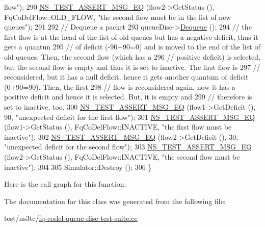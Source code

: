 \begin{DoxyCode}
{       flow"});
290   \hyperlink{group__testing_ga2a9d78cffb3db8e867c35fff0b698cf5}{NS\_TEST\_ASSERT\_MSG\_EQ} (flow2->GetStatus (), FqCoDelFlow::OLD\_FLOW, \textcolor{stringliteral}{"the second flow
       must be in the list of new queues"});
291 
292   \textcolor{comment}{// Dequeue a packet}
293   queueDisc->\hyperlink{classns3_1_1QueueDisc_a6c13fc489822c1487f61c2289f2e3629}{Dequeue} ();
294   \textcolor{comment}{// the first flow is at the head of the list of old queues but has a negative deficit, thus it gets a
       quantun}
295   \textcolor{comment}{// of deficit (-90+90=0) and is moved to the end of the list of old queues. Then, the second flow (which
       has a}
296   \textcolor{comment}{// positive deficit) is selected, but the second flow is empty and thus it is set to inactive. The first
       flow is}
297   \textcolor{comment}{// reconsidered, but it has a null deficit, hence it gets another quantum of deficit (0+90=90). Then, the
       first}
298   \textcolor{comment}{// flow is reconsidered again, now it has a positive deficit and hence it is selected. But, it is empty
       and}
299   \textcolor{comment}{// therefore is set to inactive, too.}
300   \hyperlink{group__testing_ga2a9d78cffb3db8e867c35fff0b698cf5}{NS\_TEST\_ASSERT\_MSG\_EQ} (flow1->GetDeficit (), 90, \textcolor{stringliteral}{"unexpected deficit for the first
       flow"});
301   \hyperlink{group__testing_ga2a9d78cffb3db8e867c35fff0b698cf5}{NS\_TEST\_ASSERT\_MSG\_EQ} (flow1->GetStatus (), FqCoDelFlow::INACTIVE, \textcolor{stringliteral}{"the first flow
       must be inactive"});
302   \hyperlink{group__testing_ga2a9d78cffb3db8e867c35fff0b698cf5}{NS\_TEST\_ASSERT\_MSG\_EQ} (flow2->GetDeficit (), 30, \textcolor{stringliteral}{"unexpected deficit for the second
       flow"});
303   \hyperlink{group__testing_ga2a9d78cffb3db8e867c35fff0b698cf5}{NS\_TEST\_ASSERT\_MSG\_EQ} (flow2->GetStatus (), FqCoDelFlow::INACTIVE, \textcolor{stringliteral}{"the second flow
       must be inactive"});
304 
305   Simulator::Destroy ();
306 \}
\end{DoxyCode}


Here is the call graph for this function\+:




The documentation for this class was generated from the following file\+:\begin{DoxyCompactItemize}
\item 
test/ns3tc/\hyperlink{fq-codel-queue-disc-test-suite_8cc}{fq-\/codel-\/queue-\/disc-\/test-\/suite.\+cc}\end{DoxyCompactItemize}
